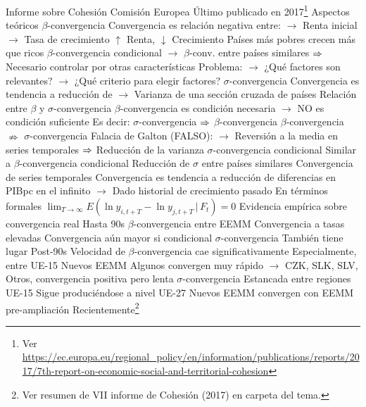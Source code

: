 \documentclass{nuevotema}
\begin{document}
\begin{esquemal}
				\4 Informe sobre Cohesión
				\4[] Comisión Europea
				\4[] Último publicado en 2017\footnote{Ver \url{https://ec.europa.eu/regional_policy/en/information/publications/reports/2017/7th-report-on-economic-social-and-territorial-cohesion}}
			\3 Aspectos teóricos
				\4 $\beta$-convergencia
				\4[] Convergencia es relación negativa entre:
				\4[] $\to$  Renta inicial
				\4[] $\to$ Tasa de crecimiento
				\4[$\then$] $\uparrow$ Renta, $\downarrow$ Crecimiento
				\4[$\then$] Países más pobres crecen más que ricos
				\4[] $\beta$-convergencia condicional
				\4[] $\to$ $\beta$-conv. entre países similares
				\4[] $\then$ Necesario controlar por otras características
				\4[] Problema:
				\4[] $\to$ ¿Qué factores son relevantes?
				\4[] $\to$ ¿Qué criterio para elegir factores?
				\4 $\sigma$-convergencia
				\4[] Convergencia es tendencia a reducción de
				\4[] $\to$ Varianza de una sección cruzada de países
				\4 Relación entre $\beta$ y $\sigma$-convergencia
				\4[] $\beta$-convergencia es condición necesaria
				\4[] $\to$ NO es condición suficiente
				\4[] Es decir:
				\4[] $\sigma$-convergencia $\then$ $\beta$-convergencia
				\4[] $\beta$-convergencia $\nRightarrow$ $\sigma$-convergencia
				\4[] Falacia de Galton (FALSO):
				\4[] $\to$ Reversión a la media en series temporales
				\4[] $\then$ Reducción de la varianza
				\4[] 
				\4 $\sigma$-convergencia condicional
				\4[] Similar a $\beta$-convergencia condicional
				\4[] Reducción de $\sigma$ entre países similares
				\4 Convergencia de series temporales
				\4[] Convergencia es tendencia a reducción de
				\4[] diferencias en PIBpc en el infinito
				\4[] $\to$ Dado historial de crecimiento pasado
				\4[] En términos formales
				\4[] $\lim_{T\to \infty} E\left( \ln y_{i, t+T} - \ln y_{j, t+T} \, | \, F_t \right) = 0$
		\2 Evidencia empírica sobre convergencia real
			\3 Hasta 90s
				\4 $\beta$-convergencia entre EEMM
				\4[] Convergencia a tasas elevadas
				\4[] Convergencia aún mayor si condicional
				\4 $\sigma$-convergencia
				\4[] También tiene lugar
			\3 Post-90s
				\4 Velocidad de $\beta$-convergencia cae significativamente
				\4[] Especialmente, entre UE-15
				\4 Nuevos EEMM
				\4[] Algunos convergen muy rápido
				\4[] $\to$ CZK, SLK, SLV,
				\4[] Otros, convergencia positiva pero lenta
				\4 $\sigma$-convergencia
				\4[] Estancada entre regiones UE-15
				\4[] Sigue produciéndose a nivel UE-27
				\4[] Nuevos EEMM convergen con EEMM pre-ampliación
			\3 Recientemente\footnote{Ver resumen de VII informe de Cohesión (2017) en carpeta del tema. }

\end{esquemal}
\end{document}
